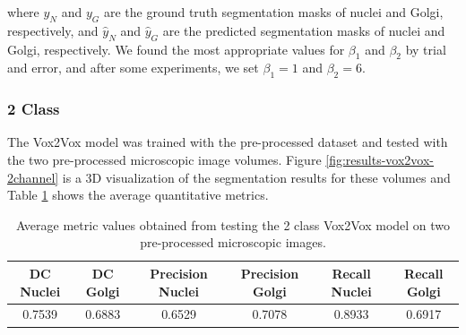 \noindent where $y_N$ and $y_G$ are the ground truth segmentation masks of nuclei and Golgi, respectively, and $\hat{y}_N$ and $\hat{y}_G$ are the predicted segmentation masks of nuclei and Golgi, respectively. We found the most appropriate values for $\beta_1$ and $\beta_2$ by trial and error, and after some experiments, we set $\beta_1 = 1$ and $\beta_2 = 6$.


\subsubsection*{2 Class}

The Vox2Vox model was trained with the pre-processed dataset and tested with the two pre-processed microscopic image volumes. Figure \ref{fig:results-vox2vox-2channel} is a \ac{3D} visualization of the segmentation results for these volumes and Table \ref{tab:results-2class-vox2vox} shows the average quantitative metrics. 

\begin{table}[!htb]
\centering
\caption{Average metric values obtained from testing the 2 class Vox2Vox model on two pre-processed microscopic images.}
\label{tab:results-2class-vox2vox}
\renewcommand\arraystretch{1.4}
\begin{tabular}{|c|c|c|c|c|c|}
\hline
DC  Nuclei & DC Golgi & Precision Nuclei & Precision Golgi & Recall Nuclei & Recall Golgi \\ \hline
0.7539     & 0.6883   & 0.6529           & 0.7078          & 0.8933        & 0.6917       \\ \hline
\end{tabular}%

\end{table}

